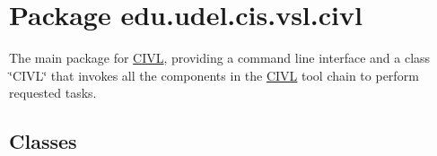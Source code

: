 \hypertarget{namespaceedu_1_1udel_1_1cis_1_1vsl_1_1civl}{}\section{Package edu.\+udel.\+cis.\+vsl.\+civl}
\label{namespaceedu_1_1udel_1_1cis_1_1vsl_1_1civl}


The main package for \hyperlink{classedu_1_1udel_1_1cis_1_1vsl_1_1civl_1_1CIVL}{C\+I\+V\+L}, providing a command line interface and a class \char`\"{}\+C\+I\+V\+L\char`\"{} that invokes all the components in the \hyperlink{classedu_1_1udel_1_1cis_1_1vsl_1_1civl_1_1CIVL}{C\+I\+V\+L} tool chain to perform requested tasks.  


\subsection*{Classes}
